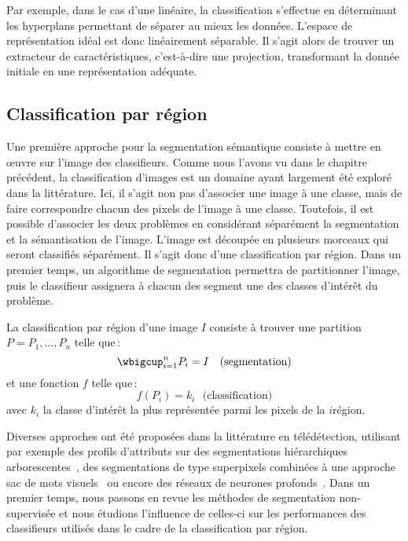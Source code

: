 Par exemple, dans le cas d'une  linéaire, la classification s'effectue en déterminant les hyperplans permettant de séparer au mieux les données. L'espace de représentation idéal est donc linéairement séparable. Il s'agit alors de trouver un extracteur de caractéristiques, c'est-à-dire une projection, transformant la donnée initiale en une représentation adéquate.

\subsection{Classification par région}

Une première approche pour la segmentation sémantique consiste à mettre en \oe{}uvre sur l'image des classifieurs. Comme nous l'avons vu dans le chapitre précédent, la classification d'images est un domaine ayant largement été exploré dans la littérature. Ici, il s'agit non pas d'associer une image à une classe, mais de faire correspondre chacun des pixels de l'image à une classe. Toutefois, il est possible d'associer les deux problèmes en considérant séparément la segmentation et la sémantisation de l'image. L'image est découpée en plusieurs morceaux qui seront classifiés séparément. Il s'agit donc d'une classification par région. Dans un premier temps, un algorithme de segmentation permettra de partitionner l'image, puis le classifieur assignera à chacun des segment une des classes d'intérêt du problème.
\begin{definition}
La classification par région d'une image $I$ consiste à trouver une partition $P = {P_1, \dots, P_n}$ telle que\,:
$$\wbigcup_{i=1}^n P_i = I~~~\text{(segmentation)}$$
et une fonction $f$ telle que\,:
$$f(P_i) = k_i~~~\text{(classification)}$$
avec $k_i$ la classe d'intérêt la plus représentée parmi les pixels de la $i$\ieme région.
\end{definition}

Diverses approches ont été proposées dans la littérature en télédétection, utilisant par exemple des profils d'attributs sur des segmentations hiérarchiques arborescentes~\cite{bosilj_indexation_2016}, des segmentations de type superpixels combinées à une approche sac de mots visuels~\cite{li_superpixel-based_2018} ou encore des réseaux de neurones profonds~\cite{gong_superpixel-based_2017}. Dans un premier temps, nous passons en revue les méthodes de segmentation non-supervisée et nous étudions l'influence de celles-ci sur les performances des classifieurs utilisés dans le cadre de la classification par région.


